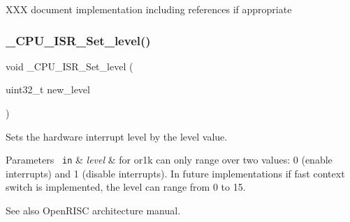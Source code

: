 X\+XX document implementation including references if appropriate \mbox{\label{group__RTEMSScoreCPUMIPS_ga912ddf7e114fd008ceb824da3423ce74}} 
\subsubsection{\texorpdfstring{\_CPU\_ISR\_Set\_level()}{\_CPU\_ISR\_Set\_level()}}
{\footnotesize\ttfamily void \+\_\+\+C\+P\+U\+\_\+\+I\+S\+R\+\_\+\+Set\+\_\+level (\begin{DoxyParamCaption}\item[{uint32\+\_\+t}]{new\+\_\+level }\end{DoxyParamCaption})}



Sets the hardware interrupt level by the level value. 


\begin{DoxyParams}[1]{Parameters}
\mbox{\texttt{ in}}  & {\em level} & for or1k can only range over two values\+: 0 (enable interrupts) and 1 (disable interrupts). In future implementations if fast context switch is implemented, the level can range from 0 to 15. \\
\hline
\end{DoxyParams}
\begin{DoxySeeAlso}{See also}
Open\+R\+I\+SC architecture manual. 
\end{DoxySeeAlso}
